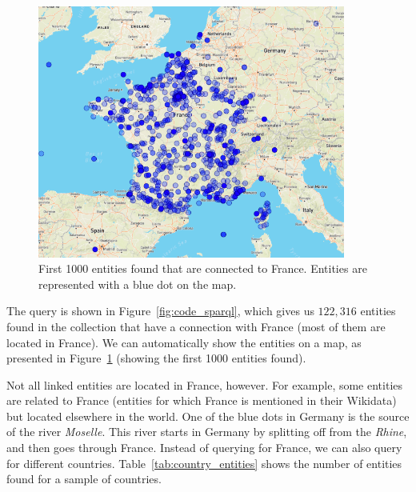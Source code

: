 \begin{figure}[!t]
	\centering
	\includegraphics[width=0.9\textwidth]{imgs/france.png}
	\caption{First 1000 entities found that are connected to France. Entities are represented with a blue dot on the map.}
	\label{fig:france}
\end{figure}

The query is shown in Figure~\ref{fig:code_sparql}, which gives us $122,316$ entities found in the collection that have a connection with France (most of them are located in France). We can automatically show the entities on a map, as presented in Figure~\ref{fig:france} (showing the first 1000 entities found). 

Not all linked entities are located in France, however. For example, some entities are related to France (entities for which France is mentioned in their Wikidata) but located elsewhere in the world. One of the blue dots in Germany is the source of the river \emph{Moselle}. This river starts in Germany by splitting off from the \emph{Rhine}, and then goes through France. 
Instead of querying for France, we can also query for different countries. Table~\ref{tab:country_entities} shows the number of entities found for a sample of countries.

